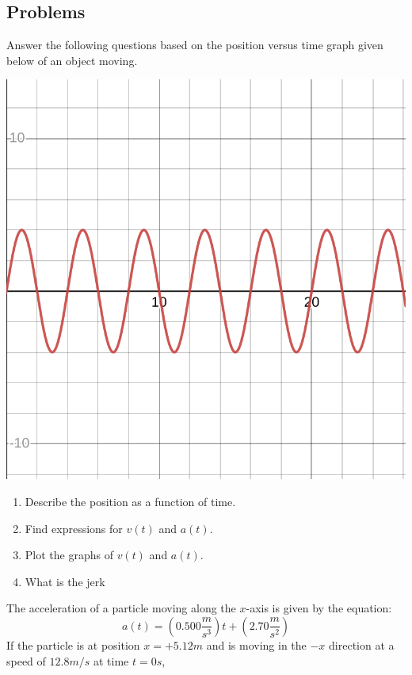 \documentclass[12pt,addpoints]{exam}
\begin{document}
	\begin{questions}
			\subsection*{Problems}
			\question[15] Answer the following questions based on the position versus time graph given below of an object moving.
			\begin{center}
				\includegraphics[scale=0.35]{q1.png}
			\end{center}		
		\begin{enumerate}[label=(\Alph*)]
			\item Describe the position as a function of time. 
			\item Find expressions for $v(t)$ and $a(t)$.
			\item Plot the graphs of $v(t)$ and $a(t)$.
			\item What is the jerk 
		\end{enumerate}
		\question[15] The acceleration of a particle moving along the  $x$-axis is given by the equation:
		$$a \left( t \right) = \left(0.500\frac{m}{s^3}\right)t + \left(2.70 \frac{m}{s^2}\right) $$
		If the particle is at position $x=+5.12m$ and is moving in the $-x$
		direction at a speed of $12.8m/s$ at time $t=0s$,
		\begin{enumerate}[label*=(\Alph*)]

\end{enumerate}
\end{questions}
\end{document}
